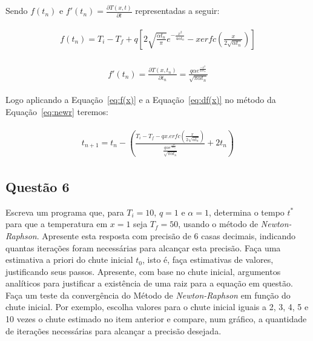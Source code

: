 \documentclass[12pt]{article}
\begin{document}
Sendo $f(t_{n})$ e $f'(t_{n}) =\frac{\partial T(x, t)}{\partial t}$ representadas a seguir:

\begin{eqnarray}
    \begin{split}
        f(t_{n}) = T_{i} - T_{f} + q \left[ 2 \sqrt{\frac{\alpha t_{n}}{\pi}} e^{- \frac{x^{2}}{4\alpha t_{n}}} - xerfc \left( \frac{x}{2 \sqrt{\alpha t_{n}}} \right) \right]
    \end{split}
    \label{eq:f(x)}
\end{eqnarray}

\begin{eqnarray}
    \begin{split}
        f'(t_{n}) = \frac{\partial T(x, t_{n})}{\partial t_{n}} = \frac{q \alpha e^{\frac{-x^{2}}{4\alpha t_{n}}}}{\sqrt{\pi \alpha t_{n}}}
    \end{split}
    \label{eq:df(x)}
\end{eqnarray}

Logo aplicando a Equação~\ref{eq:f(x)} e a Equação~\ref{eq:df(x)} no método da Equação~\ref{eq:newr} teremos:

\begin{eqnarray}
    \begin{split}
        t_{n+1} = t_{n} - \left( \frac{T_{i} - T_{f} - qx.erfc \left( \frac{x}{2\sqrt{\alpha t_{n}}} \right) }{\frac{q \alpha e^{\frac{-x^{2}}{4\alpha t_{n}}}}{\sqrt{\pi \alpha t_{n}}}} + 2t_{n}  \right)
    \end{split}
    \label{eq:newrf}
\end{eqnarray}

\subsection*{Questão 6}
\label{sec:p2q6}
Escreva um programa que, para $T_{i} = 10$, $q = 1$ e $\alpha = 1$, determina o tempo $t^{*}$ para que a temperatura em $x = 1$ seja $T_{f} = 50$, usando o método de \textit{Newton-Raphson}. Apresente esta resposta com precisão de 6 casas decimais, indicando quantas iterações foram necessárias para alcançar esta precisão. Faça uma estimativa a priori do chute inicial $t_{0}$, isto é, faça estimativas de valores, justificando seus passos. Apresente, com base no chute inicial, argumentos analíticos para justificar a existência de uma raiz para a equação em questão. Faça um teste da convergência do Método de \textit{Newton-Raphson} em função do chute inicial. Por exemplo, escolha valores para o chute inicial iguais a 2, 3, 4, 5 e 10 vezes o chute estimado no item anterior e compare, num gráfico, a quantidade de iterações necessárias para alcançar a precisão desejada.
\end{document}
